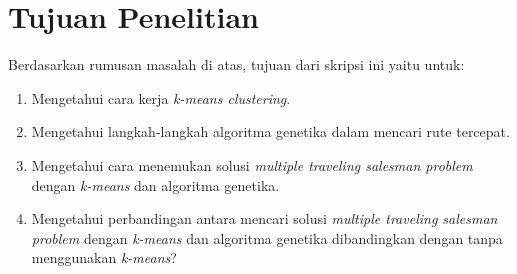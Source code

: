 \section{Tujuan Penelitian}

Berdasarkan rumusan masalah di atas, tujuan dari skripsi ini yaitu untuk:
\begin{enumerate}
	\item Mengetahui cara kerja \textit{k-means clustering}.
	\item Mengetahui langkah-langkah algoritma genetika dalam mencari rute tercepat.
	\item Mengetahui cara menemukan solusi \textit{multiple traveling salesman problem} dengan \textit{k-means} dan algoritma genetika.
	\item Mengetahui perbandingan antara mencari solusi \textit{multiple traveling salesman problem} dengan \textit{k-means} dan algoritma genetika dibandingkan dengan tanpa menggunakan \textit{k-means}?
\end{enumerate}
